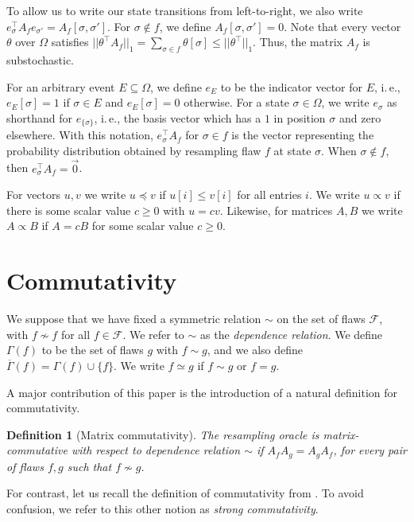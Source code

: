 \documentclass[11pt]{article}
\newtheorem{definition}[theorem]{Definition}
\newcommand{\ie}{i.\,e.}
\begin{document}
To allow us to write our state transitions from left-to-right, we also write $e_{\sigma}^{\top} A_f e_{\sigma'} = A_f[\sigma, \sigma']$.  For $\sigma \notin f$, we define $A_f[\sigma, \sigma'] = 0$.   Note that %
every  %
vector $\theta$ over $\Omega$ satisfies $|| \theta^{\top} A_f ||_1 = \sum_{\sigma \in f} \theta[\sigma] \leq || \theta^{\top} ||_1$. Thus, the matrix $A_f$ is substochastic. 



For an arbitrary event $E \subseteq \Omega$, we define $e_E$ to be the indicator vector for $E$, \ie, $e_E[\sigma] = 1$ if $\sigma \in E$ and $e_E[\sigma] = 0$ otherwise. For a state $\sigma \in \Omega$, we write $e_{\sigma}$ as shorthand for $e_{ \{ \sigma \}}$, \ie, the basis vector which has a $1$ in position $\sigma$ and zero elsewhere. With this notation,  $e_{\sigma}^{\top} A_f$ for $\sigma \in f$ is the vector representing the probability distribution obtained by resampling flaw $f$ at state $\sigma$. When $\sigma \notin f$, then $e_{\sigma}^{\top} A_f = \vec 0$.

For vectors $u, v$ we write $u \preceq v$ if $u[i] \leq v[i]$ for all entries $i$. We write $u \propto v$ if there is some scalar value 
%
$c \geq 0$ %
%
%
with $u = c v$. Likewise, for matrices $A, B$ we write $A \propto B$ if $A = c B$ for some scalar value 
%
$c \geq  0$.


\section{Commutativity}
\label{Background} 
 We suppose that we have fixed a symmetric relation $\sim$ on 
 the set of flaws %
 $\mathcal F$, %
%
%
with $f \not \sim f$ %
for all $f\in {\mathcal F}$.  %
We refer to $\sim$ as the \emph{dependence relation}. We define $ \Gamma(f)$ to be the set of flaws $g$ with $f \sim g$, and we also define $\overline \Gamma(f) = \Gamma(f) \cup  \{f \}$. We write $f \simeq g$ if $f \sim g$ or $f = g$.

%
A  %
major contribution of this paper is %
the introduction of  %
a natural definition for 
commutativity.  %

\begin{definition}[Matrix commutativity]\label{commutative_algos}
The resampling oracle is \emph{matrix-commutative} with respect to  dependence relation $\sim$ if  $A_f A_g = A_g A_f$, for every pair of flaws $f,g$ such that $f \nsim g$. 
\end{definition}

For contrast, let us recall the definition of commutativity from \cite{Kolmofocs}. To avoid confusion, we refer to this other notion as \emph{strong commutativity}.
\end{document}
